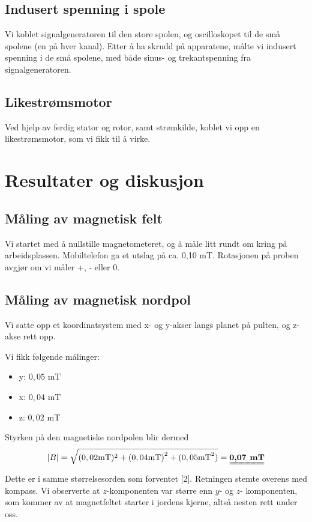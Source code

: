 \documentclass[12pt,norsk,a4paper]{article}
\begin{document}
\subsection{Indusert spenning i spole}
Vi koblet signalgeneratoren til den store spolen, og oscilloskopet til de små spolene (en på hver kanal). Etter å ha skrudd på apparatene, målte vi indusert spenning i de små spolene, med både sinus- og trekantspenning fra signalgeneratoren.

\subsection{Likestrømsmotor}
Ved hjelp av ferdig stator og rotor, samt strømkilde, koblet vi opp en likestrømsmotor, som vi fikk til å virke.
\clearpage



\section{Resultater og diskusjon}
\subsection{Måling av magnetisk felt}
Vi startet med å nullstille magnetometeret, og å måle litt rundt om kring på arbeidsplassen. Mobiltelefon ga et utslag på ca. 0,10 mT. Rotasjonen på proben avgjør om vi måler +, - eller 0.

\subsection{Måling av magnetisk nordpol}
Vi satte opp et koordinatsystem med x- og y-akser langs planet på pulten, og z-akse rett opp.

Vi fikk følgende målinger:
\begin{itemize}
\item{y: $0,05$ mT}
\item{x: $0,04$ mT}
\item{z: $0,02$ mT}
\end{itemize}
Styrken på den magnetiske nordpolen blir dermed
\begin{equation}
    \label{eq:pythagoras}
    |B| = \sqrt{{(0,02 \unit{mT}})^2 + {(0,04 \unit{mT})}^2 + {(0,05 \unit{mT}}^2)} = \uuline{\textbf{0,07 \unit{mT}}}
\end{equation}
Dette er i samme størrelsesorden som forventet {[2]}. Retningen stemte overens med kompass. Vi observerte at $z$-komponenten var større enn $y$- og $z$- komponenten, som kommer av at magnetfeltet starter i jordens kjerne, altså nesten rett under oss.
\clearpage
\end{document}
